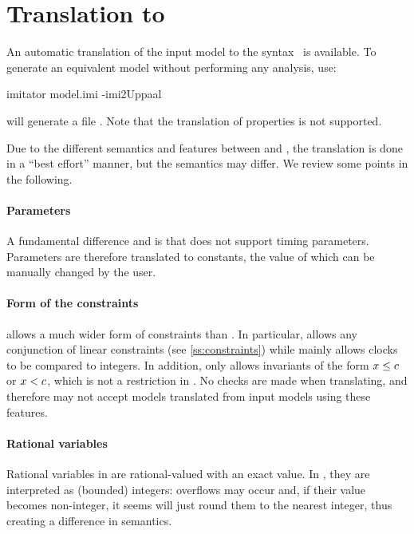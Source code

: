 \section{Translation to \uppaal{}}\label{section:uppaal}

An automatic translation of the input model to the \uppaal{} syntax~\cite{LPY97} is available.
To generate an equivalent \uppaal{} model without performing any analysis, use:

\begin{terminal}
imitator model.imi -imi2Uppaal
\end{terminal}

\imitator{} will generate a file .
Note that the translation of properties is not supported.

Due to the different semantics and features between \imitator{} and \uppaal{}, the translation is done in a ``best effort'' manner, but the semantics may differ.
We review some points in the following.

\paragraph{Parameters}
A fundamental difference \imitator{} and \uppaal{} is that \uppaal{} does not support timing parameters.
Parameters are therefore translated to constants, the value of which can be manually changed by the user.

\paragraph{Form of the constraints}
\imitator{} allows a much wider form of constraints than \uppaal{}.
In particular, \imitator{} allows any conjunction of linear constraints (see \cref{ss:constraints}) while \uppaal{} mainly allows clocks to be compared to integers.
In addition, \uppaal{} only allows invariants of the form $x \leq c$ or $x < c$, which is not a restriction in \imitator{}.
No checks are made when translating, and therefore \uppaal{} may not accept models translated from \imitator{} input models using these features.

\paragraph{Rational variables}
Rational variables in \imitator{} are rational-valued with an exact value.
In \uppaal{}, they are interpreted as (bounded) integers: overflows may occur and, if their value becomes non-integer, it seems \uppaal{} will just round them to the nearest integer, thus creating a difference in semantics.

